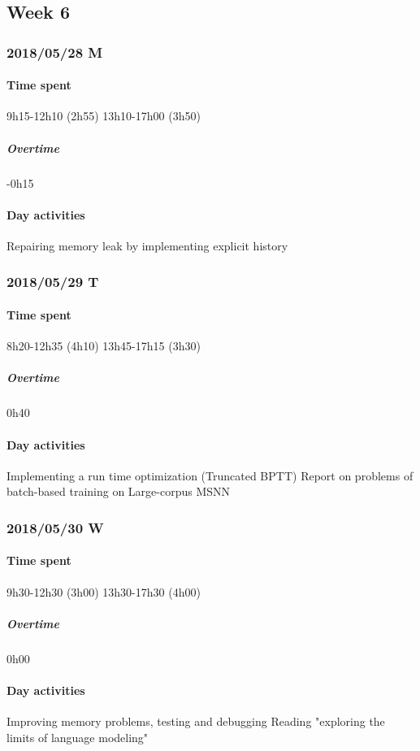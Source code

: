 \subsection{Week 6}
\subsubsection{2018/05/28 M}
\paragraph{Time spent}
{9h15}-{12h10} (2h55)
{13h10}-{17h00} (3h50)

\subparagraph{Overtime}
-0h15

\paragraph{Day activities}
Repairing memory leak by implementing explicit history

\subsubsection{2018/05/29 T}
\paragraph{Time spent}
{8h20}-{12h35} (4h10)
{13h45}-{17h15} (3h30) 

\subparagraph{Overtime}
0h40

\paragraph{Day activities}
Implementing a run time optimization (Truncated BPTT)
Report on problems of batch-based training on Large-corpus MSNN

\subsubsection{2018/05/30 W}
\paragraph{Time spent}
{9h30}-{12h30} (3h00)
{13h30}-{17h30} (4h00) 

\subparagraph{Overtime}
0h00

\paragraph{Day activities}
Improving memory problems, testing and debugging
Reading "exploring the limits of language modeling"

